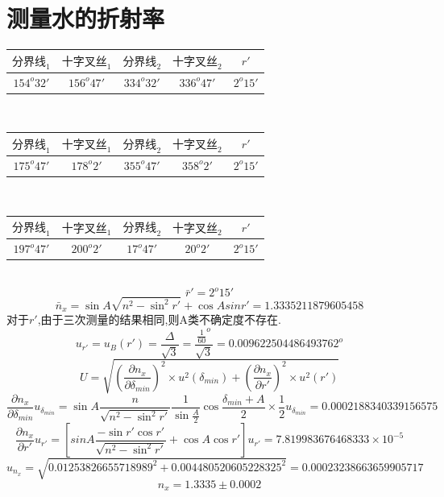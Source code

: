 \documentclass[10pt, a4paper]{article}
\begin{document}
	\section{测量水的折射率}
	\begin{tabular}{|c|c|c|c|c|}
		\hline
		$\text{分界线}_1$&$\text{十字叉丝}_1$  & $\text{分界线}_2$&$\text{十字叉丝}_2$&$r'$\\
		\hline
		$154^o32'$&$156^o47'$  & $334^o32'$ & $336^o47'$  &$ 2^o15' $\\
		\hline
	\end{tabular}\\
	
	\begin{tabular}{|c|c|c|c|c|}
		\hline
		$\text{分界线}_1$&$\text{十字叉丝}_1$  & $\text{分界线}_2$&$\text{十字叉丝}_2$&$r'$\\
		\hline
		$175^o47'$&$178^o2'$  & $355^o47'$ & $358^o2'$ &$ 2^o15' $\\
		\hline
	\end{tabular}\\
	
	\begin{tabular}{|c|c|c|c|c|}
		\hline
		$\text{分界线}_1$&$\text{十字叉丝}_1$  & $\text{分界线}_2$&$\text{十字叉丝}_2$&$r'$\\
		\hline
		$197^o47'$&$200^o2'$  & $17^o47'$ & $20^o2'$ &$ 2^o15' $\\
		\hline
	\end{tabular}\\
	\[\bar{r}' = 2^o15'\]
	\[\bar{n}_x = \sin{A}\sqrt{n^2 - \sin^2r'} + \cos{A}sinr' = 1.3335211879605458\]
	对于$r'$,由于三次测量的结果相同,则A类不确定度不存在.\\
	\[u_{r'} = u_B(r') =  \frac{\Delta}{\sqrt{3}} = \frac{\frac{1}{60}^o}{\sqrt{3}} = 0.009622504486493762
	^o\]
	\[U = \sqrt{(\frac{\partial n_x}{\partial \delta_{min}})^2\times u^2(\delta_{min})+(\frac{\partial n_x}{\partial r'})^2\times u^2(r')}\]
	\[\frac{\partial n_x}{\partial \delta_{min}}u_{\delta_{min}} = \sin{A}\frac{n}{\sqrt{n^2-\sin^2r'}}\frac{1}{\sin\frac{A}{2}}\cos\frac{\delta_{min}+A}{2}\times\frac{1}{2}u_{\delta_{min}} = 0.0002188340339156575\]
	\[\frac{\partial n_x}{\partial r'}u_{r'} =  [sin{A}\frac{-\sin{r'}\cos{r'}}{\sqrt{n^2-\sin^2{r'}}}+\cos{A}\cos{r'}]u_{r'} = 7.819983676468333\times10^{-5}\]
	\[u_{n_x} = \sqrt{0.01253826655718989^2+0.004480520605228325^2} = 0.00023238663659905717\]
	\[n_x = 1.3335\pm 0.0002\]
\end{document}
